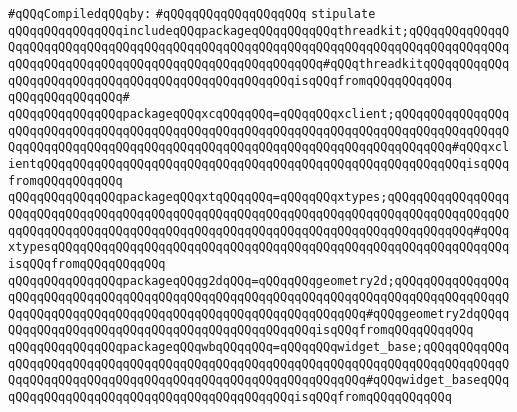 \newline
\verb|#qQQqCompiledqQQqby:|\newline
\verb|#qQQqqQQqqQQqqQQqqQQq|\newline
\newline
\newline
\verb|stipulate|\newline
\verb|qQQqqQQqqQQqqQQqincludeqQQqpackageqQQqqQQqqQQqthreadkit;qQQqqQQqqQQqqQQqqQQqqQQqqQQqqQQqqQQqqQQqqQQqqQQqqQQqqQQqqQQqqQQqqQQqqQQqqQQqqQQqqQQqqQQqqQQqqQQqqQQqqQQqqQQqqQQqqQQqqQQqqQQqqQQq#qQQqthreadkitqQQqqQQqqQQqqQQqqQQqqQQqqQQqqQQqqQQqqQQqqQQqqQQqqQQqisqQQqfromqQQqqQQqqQQq|\newline
\verb|qQQqqQQqqQQqqQQq#|\newline
\verb|qQQqqQQqqQQqqQQqpackageqQQqxcqQQqqQQq=qQQqqQQqxclient;qQQqqQQqqQQqqQQqqQQqqQQqqQQqqQQqqQQqqQQqqQQqqQQqqQQqqQQqqQQqqQQqqQQqqQQqqQQqqQQqqQQqqQQqqQQqqQQqqQQqqQQqqQQqqQQqqQQqqQQqqQQqqQQqqQQqqQQqqQQqqQQqqQQq#qQQqxclientqQQqqQQqqQQqqQQqqQQqqQQqqQQqqQQqqQQqqQQqqQQqqQQqqQQqqQQqqQQqisqQQqfromqQQqqQQqqQQq|\newline
\verb|qQQqqQQqqQQqqQQqpackageqQQqxtqQQqqQQq=qQQqqQQqxtypes;qQQqqQQqqQQqqQQqqQQqqQQqqQQqqQQqqQQqqQQqqQQqqQQqqQQqqQQqqQQqqQQqqQQqqQQqqQQqqQQqqQQqqQQqqQQqqQQqqQQqqQQqqQQqqQQqqQQqqQQqqQQqqQQqqQQqqQQqqQQqqQQqqQQqqQQq#qQQqxtypesqQQqqQQqqQQqqQQqqQQqqQQqqQQqqQQqqQQqqQQqqQQqqQQqqQQqqQQqqQQqqQQqisqQQqfromqQQqqQQqqQQq|\newline
\verb|qQQqqQQqqQQqqQQqpackageqQQqg2dqQQq=qQQqqQQqgeometry2d;qQQqqQQqqQQqqQQqqQQqqQQqqQQqqQQqqQQqqQQqqQQqqQQqqQQqqQQqqQQqqQQqqQQqqQQqqQQqqQQqqQQqqQQqqQQqqQQqqQQqqQQqqQQqqQQqqQQqqQQqqQQqqQQqqQQqqQQq#qQQqgeometry2dqQQqqQQqqQQqqQQqqQQqqQQqqQQqqQQqqQQqqQQqqQQqqQQqisqQQqfromqQQqqQQqqQQq|\newline
\verb|qQQqqQQqqQQqqQQqpackageqQQqwbqQQqqQQq=qQQqqQQqwidget_base;qQQqqQQqqQQqqQQqqQQqqQQqqQQqqQQqqQQqqQQqqQQqqQQqqQQqqQQqqQQqqQQqqQQqqQQqqQQqqQQqqQQqqQQqqQQqqQQqqQQqqQQqqQQqqQQqqQQqqQQqqQQqqQQqqQQq#qQQqwidget_baseqQQqqQQqqQQqqQQqqQQqqQQqqQQqqQQqqQQqqQQqqQQqisqQQqfromqQQqqQQqqQQq|\newline
